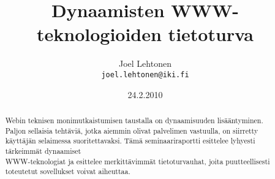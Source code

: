 \documentclass[a4paper,12pt]{article}
\title{Dynaamisten WWW-teknologioiden tietoturva}
\author{Joel Lehtonen\\ \texttt{joel.lehtonen@iki.fi}}
\date{24.2.2010}
\begin{document}
\maketitle

\begin{abstract}
Webin teknisen monimutkaistumisen taustalla on dynaamisuuden
lisääntyminen. Paljon sellaisia tehtäviä, jotka aiemmin olivat
palvelimen vastuulla, on siirretty käyttäjän selaimessa
suoritettavaksi.  Tämä seminaariraportti esittelee lyhyesti tärkeimmät
dynaamiset\\ WWW-teknologiat ja esittelee merkittävimmät
tietoturvauhat, joita puutteellisesti toteutetut sovellukset voivat
aiheuttaa.
\end{abstract}





\end{document}
